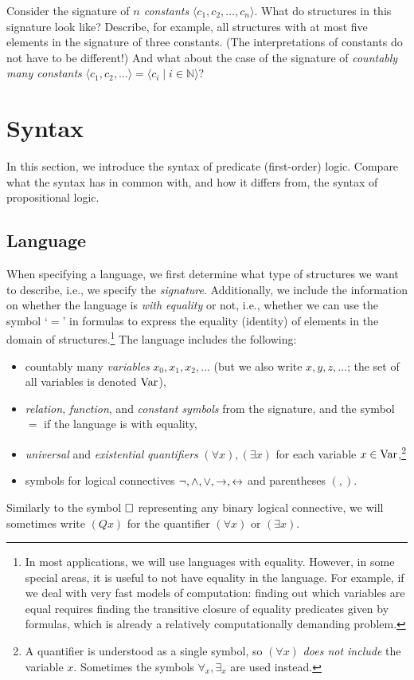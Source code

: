 \begin{exercise}
Consider the signature of \emph{$n$ constants} $\langle c_1,c_2,\dots,c_n\rangle$. What do structures in this signature look like? Describe, for example, all structures with at most five elements in the signature of three constants. (The interpretations of constants do not have to be different!)
And what about the case of the signature of \emph{countably many constants} $\langle c_1,c_2,\dots\rangle=\langle c_i\mid i\in\mathbb N\rangle$?
\end{exercise}


\section{Syntax}

In this section, we introduce the syntax of predicate (first-order) logic. Compare what the syntax has in common with, and how it differs from, the syntax of propositional logic.


\subsection{Language}

When specifying a language, we first determine what type of structures we want to describe, i.e., we specify the \emph{signature}. Additionally, we include the information on whether the language is \emph{with equality} or not, i.e., whether we can use the symbol `$=$' in formulas to express the equality (identity) of elements in the domain of structures.\footnote{In most applications, we will use languages with equality. However, in some special areas, it is useful to not have equality in the language. For example, if we deal with very fast models of computation: finding out which variables are equal requires finding the transitive closure of equality predicates given by formulas, which is already a relatively computationally demanding problem.} The language includes the following:
\begin{itemize}
    \item countably many \emph{variables} $x_0,x_1,x_2,\dots$ (but we also write $x,y,z,\dots$; the set of all variables is denoted $\operatorname{Var}$),
    \item \emph{relation}, \emph{function}, and \emph{constant symbols} from the signature, and the symbol $=$ if the language is with equality,
    \item \emph{universal} and \emph{existential} \emph{quantifiers} $(\forall x),(\exists x)$ for each variable $x\in\operatorname{Var}$,\footnote{A quantifier is understood as a single symbol, so $(\forall x)$ \emph{does not include} the variable $x$. Sometimes the symbols $\forall_x,\exists_x$ are used instead.}
    \item symbols for logical connectives \( \neg,{\land},{\lor}, {\mathbin{\rightarrow}}, {\mathbin{\leftrightarrow}} \) and parentheses \( (,) \).
\end{itemize}
Similarly to the symbol ${\mathbin{\square}}$ representing any binary logical connective, we will sometimes write $(Qx)$ for the quantifier $(\forall x)$ or $(\exists x)$.

